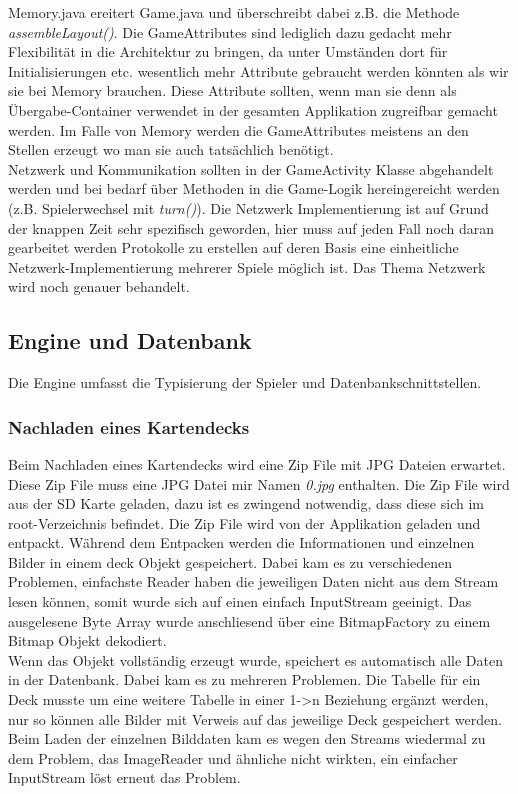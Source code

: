 \documentclass[11pt,a4paper]{article}
\begin{document}
Memory.java ereitert Game.java und überschreibt dabei z.B. die Methode \emph{assembleLayout()}. Die GameAttributes sind lediglich dazu gedacht mehr Flexibilität in die Architektur zu bringen, da unter Umständen dort für Initialisierungen etc. wesentlich mehr Attribute gebraucht werden könnten als wir sie bei Memory brauchen. Diese Attribute sollten, wenn man sie denn als Übergabe-Container verwendet in der gesamten Applikation zugreifbar gemacht werden. Im Falle von Memory werden die GameAttributes meistens an den Stellen erzeugt wo man sie auch tatsächlich benötigt. \\
Netzwerk und Kommunikation sollten in der GameActivity Klasse abgehandelt werden und bei bedarf über Methoden in die Game-Logik hereingereicht werden (z.B. Spielerwechsel mit \emph{turn()}). Die Netzwerk Implementierung ist auf Grund der knappen Zeit sehr spezifisch geworden, hier muss auf jeden Fall noch daran gearbeitet werden Protokolle zu erstellen auf deren Basis eine einheitliche Netzwerk-Implementierung mehrerer Spiele möglich ist. Das Thema Netzwerk wird noch genauer behandelt.

\subsection{Engine und Datenbank}
Die Engine umfasst die Typisierung der Spieler und Datenbankschnittstellen.
\subsubsection{Nachladen eines Kartendecks}
Beim Nachladen eines Kartendecks wird eine Zip File mit JPG Dateien erwartet. Diese Zip File muss eine JPG Datei mir Namen {\em 0.jpg} enthalten. Die Zip File wird aus der SD Karte geladen, dazu ist es zwingend notwendig, dass diese sich im root-Verzeichnis befindet.
Die Zip File wird von der Applikation geladen und entpackt. Während dem Entpacken werden die Informationen und einzelnen Bilder in einem deck Objekt gespeichert. Dabei kam es zu verschiedenen Problemen, einfachste Reader haben die jeweiligen Daten nicht aus dem Stream lesen können, somit wurde sich auf einen einfach InputStream geeinigt. Das ausgelesene Byte Array wurde anschliesend über eine BitmapFactory zu einem Bitmap Objekt dekodiert.\\
Wenn das Objekt vollständig erzeugt wurde, speichert es automatisch alle Daten in der Datenbank. Dabei kam es zu mehreren Problemen. Die Tabelle für ein Deck musste um eine weitere Tabelle in einer 1->n Beziehung ergänzt werden, nur so können alle Bilder mit Verweis auf das jeweilige Deck gespeichert werden.\\
Beim Laden der einzelnen Bilddaten kam es wegen den Streams wiedermal zu dem Problem, das ImageReader und ähnliche nicht wirkten, ein einfacher InputStream löst erneut das Problem.
\end{document}
